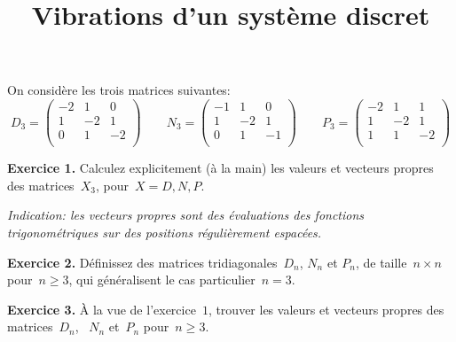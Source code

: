 %
%
%
%
%

\title{Vibrations d'un système discret}

On considère les trois matrices suivantes:
\[
	D_3=\begin{pmatrix}
		-2 & 1 & 0 \\
		1 & -2 & 1 \\
		0 & 1 & -2 \\
	\end{pmatrix}
	\qquad
	N_3=\begin{pmatrix}
		-1 & 1 & 0 \\
		1 & -2 & 1 \\
		0 & 1 & -1 \\
	\end{pmatrix}
	\qquad
	P_3=\begin{pmatrix}
		-2 & 1 & 1 \\
		1 & -2 & 1 \\
		1 & 1 & -2 \\
	\end{pmatrix}
\]

{\bf Exercice 1.}
Calculez explicitement (à la main) les valeurs et vecteurs propres des
matrices~$X_3$, pour~$X=D,N,P$.

{\sl Indication: les vecteurs propres sont des évaluations des fonctions
trigonométriques sur des positions régulièrement espacées.}

{\bf Exercice 2.}
Définissez des matrices tridiagonales~$D_n$, $N_n$ et $P_n$, de taille~$n\times
n$ pour~$n\ge 3$, qui généralisent le cas particulier~$n=3$.

{\bf Exercice 3.}
À la vue de l'exercice~$1$, trouver les valeurs et vecteurs propres des
matrices~$D_n$, ~$N_n$ et~$P_n$ pour~$n\ge 3$.

